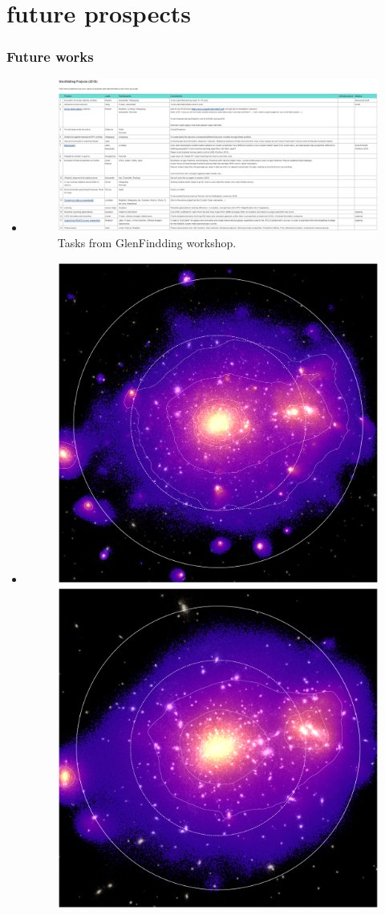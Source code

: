 \documentclass[aspectratio=43]{beamer}
\begin{document}
\section{future prospects}\label{lastpage}
\begin{frame}
  \frametitle{Future works}
  \begin{itemize}
    \item<1|only@1>[]{
    \begin{figure}
      \includegraphics[width=\linewidth]{Tasks18}
      \caption{Tasks from GlenFindding workshop.}
    \end{figure}}
    \item<2|only@2>[]{
    \begin{figure}
      \includegraphics[width=0.5\linewidth]{Music-17-image.pdf}
      \includegraphics[width=0.5\linewidth]{G3X-17-image.pdf}

\end{figure}}
\end{itemize}
\end{frame}
\end{document}
